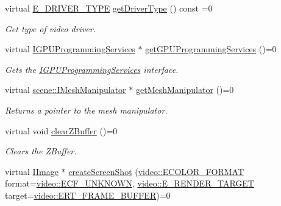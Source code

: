 \begin{DoxyCompactItemize}
virtual \hyperlink{namespaceirr_1_1video_ae35a6de6d436c76107ad157fe42356d0}{E\+\_\+\+D\+R\+I\+V\+E\+R\+\_\+\+T\+Y\+PE} \hyperlink{classirr_1_1video_1_1IVideoDriver_af89a0c4fcc0337f3befe8b90424e68aa}{get\+Driver\+Type} () const =0
\begin{DoxyCompactList}\small\item\em Get type of video driver. \end{DoxyCompactList}\item 
virtual \hyperlink{classirr_1_1video_1_1IGPUProgrammingServices}{I\+G\+P\+U\+Programming\+Services} $\ast$ \hyperlink{classirr_1_1video_1_1IVideoDriver_ad2098a408bbe9dad8053c3f4aea7d856}{get\+G\+P\+U\+Programming\+Services} ()=0
\begin{DoxyCompactList}\small\item\em Gets the \hyperlink{classirr_1_1video_1_1IGPUProgrammingServices}{I\+G\+P\+U\+Programming\+Services} interface. \end{DoxyCompactList}\item 
\mbox{\label{classirr_1_1video_1_1IVideoDriver_a9b76ea8ba013885c0f3d5f00131431ec}} 
virtual \hyperlink{classirr_1_1scene_1_1IMeshManipulator}{scene\+::\+I\+Mesh\+Manipulator} $\ast$ \hyperlink{classirr_1_1video_1_1IVideoDriver_a9b76ea8ba013885c0f3d5f00131431ec}{get\+Mesh\+Manipulator} ()=0
\begin{DoxyCompactList}\small\item\em Returns a pointer to the mesh manipulator. \end{DoxyCompactList}\item 
virtual void \hyperlink{classirr_1_1video_1_1IVideoDriver_a2036fe0a27dbd1a123ff5aedb07373a5}{clear\+Z\+Buffer} ()=0
\begin{DoxyCompactList}\small\item\em Clears the Z\+Buffer. \end{DoxyCompactList}\item 
virtual \hyperlink{classirr_1_1video_1_1IImage}{I\+Image} $\ast$ \hyperlink{classirr_1_1video_1_1IVideoDriver_a50db0e36d406089167facf70b2eb4706}{create\+Screen\+Shot} (\hyperlink{namespaceirr_1_1video_a1d5e487888c32b1674a8f75116d829ed}{video\+::\+E\+C\+O\+L\+O\+R\+\_\+\+F\+O\+R\+M\+AT} format=\hyperlink{namespaceirr_1_1video_a1d5e487888c32b1674a8f75116d829eda8d25e5e1e9c83f95c4f7d48e11688a51}{video\+::\+E\+C\+F\+\_\+\+U\+N\+K\+N\+O\+WN}, \hyperlink{namespaceirr_1_1video_a5b61a3f2bd5d458f76f2eb20b0f40972}{video\+::\+E\+\_\+\+R\+E\+N\+D\+E\+R\+\_\+\+T\+A\+R\+G\+ET} target=\hyperlink{namespaceirr_1_1video_a5b61a3f2bd5d458f76f2eb20b0f40972a232d0f49241a378e11d4a37e752d3d73}{video\+::\+E\+R\+T\+\_\+\+F\+R\+A\+M\+E\+\_\+\+B\+U\+F\+F\+ER})=0

\end{DoxyCompactItemize}
